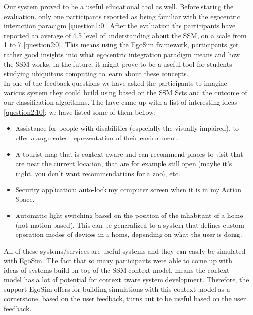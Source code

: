 Our system proved to be a useful educational tool as well. Before staring the evaluation, only one participants reported as being familiar with the egocentric interaction paradigm \ref{question1:0}. After the evaluation the participants have reported an average of 4.5 level of understanding about the SSM, on a scale from 1 to 7 \ref{question2:0}. This means using the EgoSim framework, participants got rather good insights into what egocentric integration paradigm means and how the SSM works. In the future, it might prove to be a useful tool for students studying ubiquitous computing to learn about these concepts.\\

In one of the feedback questions we have asked the participants to imagine various system they could build using based on the SSM Sets and the outcome of our classification algorithms. The have came up with a list of interesting ideas \ref{question2:10}; we have listed some of them bellow:
\begin{itemize}
	\item Assistance for people with disabilities (especially the visually impaired), to offer a augmented representation of their environment.
	\item A tourist map that is context aware and can recommend places to visit that are near the current location, that are for example still open (maybe it's night, you don't want recommendations for a zoo), etc.
	\item Security application: auto-lock my computer screen when it is in my Action Space.
	\item Automatic light switching based on the position of the inhabitant of a home (not motion-based). This can be generalized to a system that defines custom operation modes of devices in a home, depending on what the user is doing.
\end{itemize}

All of these systems/services are useful systems and they can easily be simulated with EgoSim. The fact that so many participants were able to come up with ideas of systems build on top of the SSM context model, means the context model has a lot of potential for context aware system development. Therefore, the support EgoSim offers for building simulations with this context model as a cornerstone, based on the user feedback, turns out to be useful based on the user feedback.

